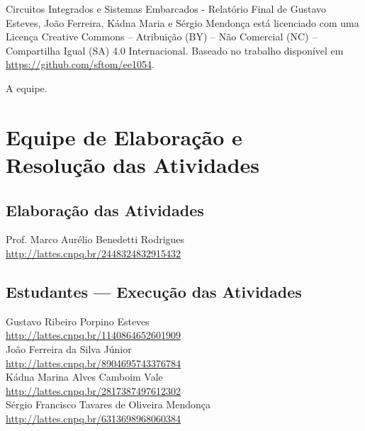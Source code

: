 \documentclass[
	12pt,				%
	openright,			%
  oneside,     %
	a4paper,			%
	english,			%
	french,				%
	spanish,			%
	brazil				%
	]{abntex2}
\begin{document}
\noindent Circuitos Integrados e Sistemas Embarcados - Relatório Final de Gustavo Esteves, João Ferreira, Kádna Maria e Sérgio Mendonça está licenciado com uma Licença Creative Commons --  Atribuição (BY) -- Não Comercial (NC) -- Compartilha Igual (SA) 4.0 Internacional. Baseado no trabalho disponível em \url{https://github.com/sftom/ee1054}.

\hfill \noindent A equipe.

\newpage


\chapter*[Equipe de Elaboração e \\Resolução das Atividades]{Equipe de Elaboração e \\Resolução das Atividades}


\section*{Elaboração das Atividades}

\noindent Prof. Marco Aurélio Benedetti Rodrigues\\
\url{http://lattes.cnpq.br/2448324832915432}\\



\section*{Estudantes --- Execução das Atividades}

\noindent Gustavo Ribeiro Porpino Esteves\\
\url{http://lattes.cnpq.br/1140864652601909}\\

\noindent João Ferreira da Silva Júnior\\
\url{http://lattes.cnpq.br/8904695743376784}\\

\noindent Kádna Marina Alves Camboim Vale\\
\url{http://lattes.cnpq.br/2817387497612302}\\

\noindent Sérgio Francisco Tavares de Oliveira Mendonça\\
\url{http://lattes.cnpq.br/6313698968060384}\\
\end{document}
